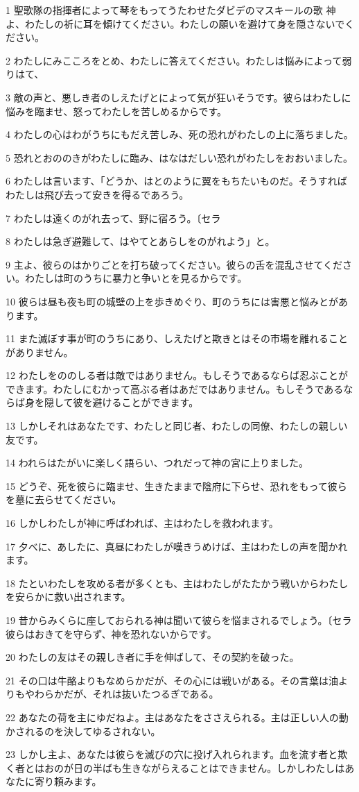 \par 1 聖歌隊の指揮者によって琴をもってうたわせたダビデのマスキールの歌 神よ、わたしの祈に耳を傾けてください。わたしの願いを避けて身を隠さないでください。
\par 2 わたしにみこころをとめ、わたしに答えてください。わたしは悩みによって弱りはて、
\par 3 敵の声と、悪しき者のしえたげとによって気が狂いそうです。彼らはわたしに悩みを臨ませ、怒ってわたしを苦しめるからです。
\par 4 わたしの心はわがうちにもだえ苦しみ、死の恐れがわたしの上に落ちました。
\par 5 恐れとおののきがわたしに臨み、はなはだしい恐れがわたしをおおいました。
\par 6 わたしは言います、「どうか、はとのように翼をもちたいものだ。そうすればわたしは飛び去って安きを得るであろう。
\par 7 わたしは遠くのがれ去って、野に宿ろう。〔セラ
\par 8 わたしは急ぎ避難して、はやてとあらしをのがれよう」と。
\par 9 主よ、彼らのはかりごとを打ち破ってください。彼らの舌を混乱させてください。わたしは町のうちに暴力と争いとを見るからです。
\par 10 彼らは昼も夜も町の城壁の上を歩きめぐり、町のうちには害悪と悩みとがあります。
\par 11 また滅ぼす事が町のうちにあり、しえたげと欺きとはその市場を離れることがありません。
\par 12 わたしをののしる者は敵ではありません。もしそうであるならば忍ぶことができます。わたしにむかって高ぶる者はあだではありません。もしそうであるならば身を隠して彼を避けることができます。
\par 13 しかしそれはあなたです、わたしと同じ者、わたしの同僚、わたしの親しい友です。
\par 14 われらはたがいに楽しく語らい、つれだって神の宮に上りました。
\par 15 どうぞ、死を彼らに臨ませ、生きたままで陰府に下らせ、恐れをもって彼らを墓に去らせてください。
\par 16 しかしわたしが神に呼ばわれば、主はわたしを救われます。
\par 17 夕べに、あしたに、真昼にわたしが嘆きうめけば、主はわたしの声を聞かれます。
\par 18 たといわたしを攻める者が多くとも、主はわたしがたたかう戦いからわたしを安らかに救い出されます。
\par 19 昔からみくらに座しておられる神は聞いて彼らを悩まされるでしょう。〔セラ彼らはおきてを守らず、神を恐れないからです。
\par 20 わたしの友はその親しき者に手を伸ばして、その契約を破った。
\par 21 その口は牛酪よりもなめらかだが、その心には戦いがある。その言葉は油よりもやわらかだが、それは抜いたつるぎである。
\par 22 あなたの荷を主にゆだねよ。主はあなたをささえられる。主は正しい人の動かされるのを決してゆるされない。
\par 23 しかし主よ、あなたは彼らを滅びの穴に投げ入れられます。血を流す者と欺く者とはおのが日の半ばも生きながらえることはできません。しかしわたしはあなたに寄り頼みます。

